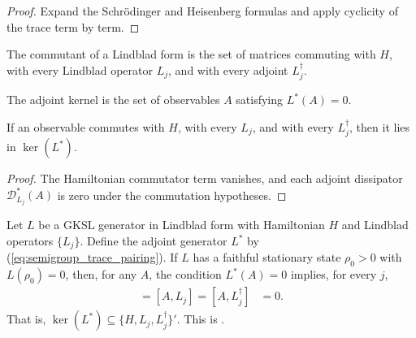 \begin{proof}
    \leanok
    Expand the Schr\"odinger and Heisenberg formulas and apply cyclicity of the trace term by term.
\end{proof}

\begin{definition}
    \label{def:commutant_ch12}
    \leanok
    The commutant of a Lindblad form is the set of matrices commuting with $H$,
    with every Lindblad operator $L_j$, and with every adjoint $L_j^\dagger$.
\end{definition}

\begin{definition}
    \label{def:adjoint_kernel_ch12}
    \leanok
    The adjoint kernel is the set of observables $A$ satisfying $L^*(A)=0$.
\end{definition}

\begin{theorem}
    \label{thm:commutant_subset_adjointKernel_ch12}
    \leanok
    If an observable commutes with $H$, with every $L_j$, and with every
    $L_j^\dagger$, then it lies in $\ker(L^*)$.
\end{theorem}

\begin{proof}
    \leanok
    The Hamiltonian commutator term vanishes, and each adjoint dissipator
    $\mathcal{D}_{L_j}^*(A)$ is zero under the commutation hypotheses.
\end{proof}

\begin{theorem}
    \label{thm:adjointKernel_eq_commutant}
    \leanok
    Let $L$ be a GKSL generator in Lindblad form with Hamiltonian $H$
    and Lindblad operators $\{L_j\}$.
    Define the adjoint generator $L^*$ by
    (\ref{eq:semigroup_trace_pairing}).
    If $L$ has a faithful stationary state $\rho_0>0$ with $L(\rho_0)=0$,
    then, for any $A$, the condition $L^*(A)=0$ implies, for every $j$,
    \begin{align}
        [A,H]=[A,L_j]=[A,L_j^\dagger]
        &=0.
        \label{eq:semigroup_kernel_commutators}
    \end{align}
    That is, $\ker(L^*)\subseteq\{H,L_j,L_j^\dagger\}'$.
    This is \cite[Theorem~7.2]{Wolf2012Quantum}.
\end{theorem}

